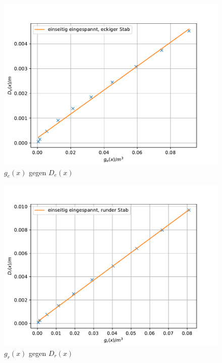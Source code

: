 \begin{figure}[h!]
  \centering
  \includegraphics[width=\textwidth]{plotdge.pdf}
  \caption{$g_{e}(x)$ gegen $D_{e}(x)$}
  \label{fig:dge}
\end{figure}

\begin{figure}[h!]
  \centering
  \includegraphics[width=\textwidth]{plotdgr.pdf}
  \caption{$g_{r}(x)$ gegen $D_{r}(x)$}
  \label{fig:dgr}
\end{figure}

